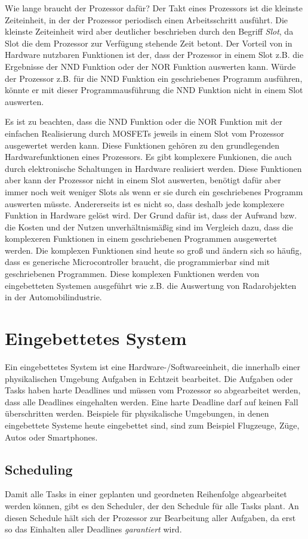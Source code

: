 \documentclass{scrarticle}
\numberwithin{equation}{section}
\begin{document}
Wie lange braucht der Prozessor dafür? Der Takt eines Prozessors ist die kleinste Zeiteinheit, in der der Prozessor periodisch einen Arbeitsschritt ausführt. Die kleinste Zeiteinheit wird aber deutlicher beschrieben durch den Begriff \textit{Slot}, da Slot die dem Prozessor zur Verfügung stehende Zeit betont. Der Vorteil von in Hardware nutzbaren Funktionen ist der, dass der Prozessor in einem Slot z.B. die Ergebnisse der NND Funktion oder der NOR Funktion auswerten kann. Würde der Prozessor z.B. für die NND Funktion ein geschriebenes Programm ausführen, könnte er mit dieser Programmausführung die NND Funktion nicht in einem Slot auswerten.

Es ist zu beachten, dass die NND Funktion oder die NOR Funktion mit der einfachen Realisierung durch MOSFETs jeweils in einem Slot vom Prozessor ausgewertet werden kann. Diese Funktionen gehören zu den grundlegenden Hardwarefunktionen eines Prozessors. Es gibt komplexere Funkionen, die auch durch elektronische Schaltungen in Hardware realisiert werden. Diese Funktionen aber kann der Prozessor nicht in einem Slot auswerten, benötigt dafür aber immer noch weit weniger Slots als wenn er sie durch ein geschriebenes Programm auswerten müsste. Andererseits ist es nicht so, dass deshalb jede komplexere Funktion in Hardware gelöst wird. Der Grund dafür ist, dass der Aufwand bzw. die Kosten und der Nutzen unverhältnismäßig sind im Vergleich dazu, dass die komplexeren Funktionen in einem geschriebenen Programmen ausgewertet werden. Die komplexen Funktionen sind heute so groß und ändern sich so häufig, dass es generische Microcontroller braucht, die programmierbar sind mit geschriebenen Programmen. Diese komplexen Funktionen werden von eingebetteten Systemen ausgeführt wie z.B. die Auswertung von Radarobjekten in der Automobilindustrie.

\section{Eingebettetes System}
Ein eingebettetes System ist eine Hardware-/Softwareeinheit, die innerhalb einer physikalischen Umgebung Aufgaben in Echtzeit bearbeitet. Die Aufgaben oder Tasks haben harte Deadlines und müssen vom Prozessor so abgearbeitet werden, dass alle Deadlines eingehalten werden. Eine harte Deadline darf auf keinen Fall überschritten werden. Beispiele für physikalische Umgebungen, in denen eingebettete Systeme heute eingebettet sind, sind zum Beispiel Flugzeuge, Züge, Autos oder Smartphones.

\subsection{Scheduling}
Damit alle Tasks in einer geplanten und geordneten Reihenfolge abgearbeitet werden können, gibt es den Scheduler, der den Schedule für alle Tasks plant. An diesen Schedule hält sich der Prozessor zur Bearbeitung aller Aufgaben, da erst so das Einhalten aller Deadlines \textit{garantiert} wird.
\end{document}

